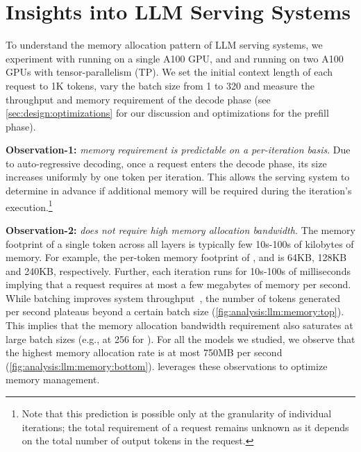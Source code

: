 \section{Insights into LLM Serving Systems}
\label{sec:analysis}

To understand the memory allocation pattern of LLM serving systems, we experiment with  \yismall running on a single A100 GPU, and \llamasmall and \yimedium running on two A100 GPUs with tensor-parallelism (TP). We set the initial context length of each request to 1K tokens, vary the batch size from 1 to 320 and measure the throughput and memory requirement of the decode phase (see \autoref{sec:design:optimizations} for our discussion and optimizations for the prefill phase).




\noindent
\textbf{Observation-1:} \textit{\kvcache memory requirement is predictable on a per-iteration basis}. Due to auto-regressive decoding, once a request enters the decode phase, its \kvcache size increases uniformly by one token per iteration. This allows the serving system to determine in advance if additional memory will be required during the iteration's execution.\footnote{Note that this prediction is possible only at the granularity of individual iterations; the total \kvcache requirement of a request remains unknown as it depends on the total number of output tokens in the request.}


\noindent
\textbf{Observation-2:} \textit{\kvcache does not require high memory allocation bandwidth.} The memory footprint of a single token across all layers is typically few 10s-100s of kilobytes of memory. For example, the per-token memory footprint of \yismall, \llamasmall and \yimedium is 64KB, 128KB and 240KB, respectively. Further, each iteration runs for 10s-100s of milliseconds implying that a request requires at most a few megabytes of memory per second. While batching improves system throughput~\cite{sarathi2023,sarathiserve2024,patel2023splitwise,distserve2024}, the number of tokens generated per second plateaus beyond a certain batch size (\autoref{fig:analysis:llm:memory:top}). This implies that the memory allocation bandwidth requirement also saturates at large batch sizes (e.g., at 256 for \yimedium). For all the models we studied, we observe that the highest memory allocation rate is at most 750MB per second (\autoref{fig:analysis:llm:memory:bottom}). \sysname leverages these observations to optimize \kvcache memory management. 



